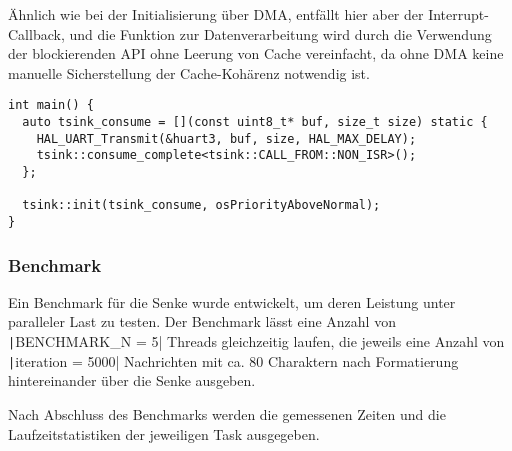 Ähnlich wie bei der Initialisierung über DMA, entfällt hier aber der
Interrupt-Callback, und die Funktion zur Datenverarbeitung wird durch die
Verwendung der blockierenden API ohne Leerung von Cache vereinfacht, da ohne DMA
keine manuelle Sicherstellung der Cache-Kohärenz notwendig ist.

\begin{code}
\begin{verbatim}
int main() {
  auto tsink_consume = [](const uint8_t* buf, size_t size) static {
    HAL_UART_Transmit(&huart3, buf, size, HAL_MAX_DELAY);
    tsink::consume_complete<tsink::CALL_FROM::NON_ISR>();
  };

  tsink::init(tsink_consume, osPriorityAboveNormal);
}
\end{verbatim}
\end{code}

\subsubsection{Benchmark}

Ein Benchmark für die Senke wurde entwickelt, um deren Leistung unter paralleler
Last zu testen. Der Benchmark lässt eine Anzahl von
\texttt|BENCHMARK_N = 5| Threads gleichzeitig laufen, die jeweils eine
Anzahl von \texttt|iteration = 5000| Nachrichten mit ca. 80 Charaktern
nach Formatierung hintereinander über die Senke ausgeben.

Nach Abschluss des Benchmarks werden die gemessenen Zeiten und die
Laufzeitstatistiken der jeweiligen Task ausgegeben.

